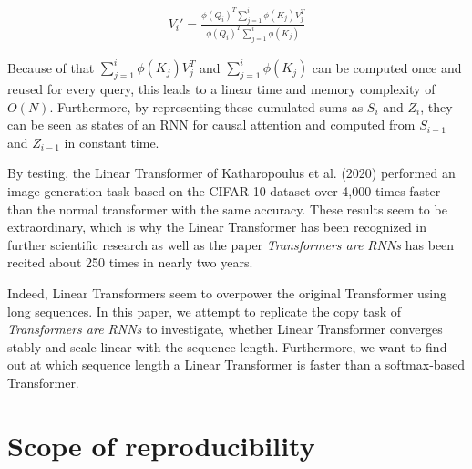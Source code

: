 \documentclass[DIV=13,fontsize=11pt]{scrartcl}
\begin{document}
\begin{align}
    V_{i}' {=} \frac{\phi(Q_{i})^T \sum_{j=1}^{i} \phi(K_{j})V_{j}^T}{\phi(Q_{i})^T \sum_{j=1}^{i}\phi(K_{j})}
\end{align}

Because of that \(\sum_{j=1}^{i} \phi(K_{j})V_{j}^T\) and \(\sum_{j=1}^{i}\phi(K_{j})\) can be computed once and reused for every query, this leads to a linear time and memory complexity of \(O(N)\). Furthermore, by representing these cumulated sums as \(S_{i}\) and \(Z_{i}\), they can be seen as states of an RNN for causal attention and computed from \(S_{i-1}\) and \(Z_{i-1}\) in constant time.

By testing, the Linear Transformer of Katharopoulus et al. (2020) performed an image generation task based on the CIFAR-10 dataset over 4,000 times faster than the normal transformer with the same accuracy.  These results seem to be extraordinary, which is why the Linear Transformer has been recognized in further scientific research as well as the paper \textit{Transformers are RNNs} has been recited about 250 times in nearly two years. 

Indeed, Linear Transformers seem to overpower the original Transformer using long sequences. In this paper, we attempt to replicate the copy task of \textit{Transformers are RNNs} to investigate, whether Linear Transformer converges stably and scale linear with the sequence length. Furthermore, we want to find out at which sequence length a Linear Transformer is faster than a softmax-based Transformer.




\section{Scope of reproducibility}
    
\end{document}
